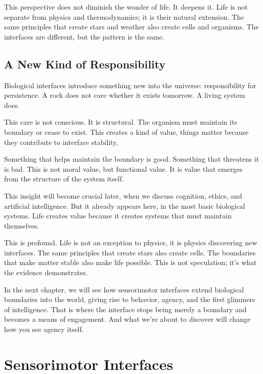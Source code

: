 \documentclass[
  openright]{book}
\begin{document}
This perspective does not diminish the wonder of life. It deepens it.
Life is not separate from physics and thermodynamics; it is their
natural extension. The same principles that create stars and weather
also create cells and organisms. The interfaces are different, but the
pattern is the same.

\section{A New Kind of
Responsibility}\label{a-new-kind-of-responsibility}

Biological interfaces introduce something new into the universe:
responsibility for persistence. A rock does not care whether it exists
tomorrow. A living system does.

This care is not conscious. It is structural. The organism must maintain
its boundary or cease to exist. This creates a kind of value, things
matter because they contribute to interface stability.

Something that helps maintain the boundary is good. Something that
threatens it is bad. This is not moral value, but functional value. It
is value that emerges from the structure of the system itself.

This insight will become crucial later, when we discuss cognition,
ethics, and artificial intelligence. But it already appears here, in the
most basic biological systems. Life creates value because it creates
systems that must maintain themselves.

This is profound. Life is not an exception to physics, it is physics
discovering new interfaces. The same principles that create stars also
create cells. The boundaries that make matter stable also make life
possible. This is not speculation; it's what the evidence demonstrates.

In the next chapter, we will see how sensorimotor interfaces extend
biological boundaries into the world, giving rise to behavior, agency,
and the first glimmers of intelligence. That is where the interface
stops being merely a boundary and becomes a means of engagement. And
what we're about to discover will change how you see agency itself.

\chapter{\texorpdfstring{Sensorimotor
Interfaces}{Sensorimotor Interfaces}}\label{sensorimotor-interfaces}
\end{document}
